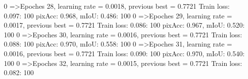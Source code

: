   0%
=>Epoches 28, learning rate = 0.0018,                 previous best = 0.7721
Train loss: 0.097: 100%
pixAcc: 0.968, mIoU: 0.486: 100%
  0%
=>Epoches 29, learning rate = 0.0017,                 previous best = 0.7721
Train loss: 0.086: 100%
pixAcc: 0.967, mIoU: 0.520: 100%
  0%
=>Epoches 30, learning rate = 0.0016,                 previous best = 0.7721
Train loss: 0.088: 100%
pixAcc: 0.970, mIoU: 0.558: 100%
  0%
=>Epoches 31, learning rate = 0.0016,                 previous best = 0.7721
Train loss: 0.090: 100%
pixAcc: 0.970, mIoU: 0.540: 100%
  0%
=>Epoches 32, learning rate = 0.0015,                 previous best = 0.7721
Train loss: 0.082: 100%
